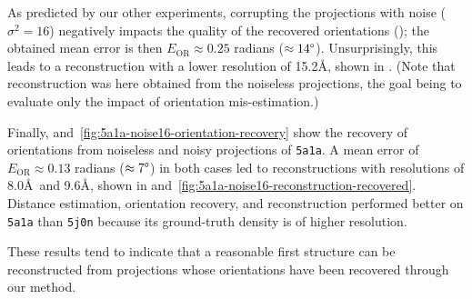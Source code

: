 As predicted by our other experiments, corrupting the projections with noise ($\sigma^2=16$) negatively impacts the quality of the recovered orientations (); the obtained mean error is then $E_\text{OR} \approx 0.25$ radians ($\approx 14\degree$).
Unsurprisingly, this leads to a reconstruction with a lower resolution of 15.2\AA, shown in .
(Note that reconstruction was here obtained from the noiseless projections, the goal being to evaluate only the impact of orientation mis-estimation.)

Finally,  and~\ref{fig:5a1a-noise16-orientation-recovery} show the recovery of orientations from noiseless and noisy projections of \texttt{5a1a}.
A mean error of $E_\text{OR} \approx 0.13$ radians ($\approx 7\degree$) in both cases led to reconstructions with resolutions of 8.0\AA\ and 9.6\AA, shown in  and~\ref{fig:5a1a-noise16-reconstruction-recovered}.
Distance estimation, orientation recovery, and reconstruction performed better on \texttt{5a1a} than \texttt{5j0n} because its ground-truth density is of higher resolution.


These results tend to indicate that a reasonable first structure can be reconstructed from projections whose orientations have been recovered through our method.

